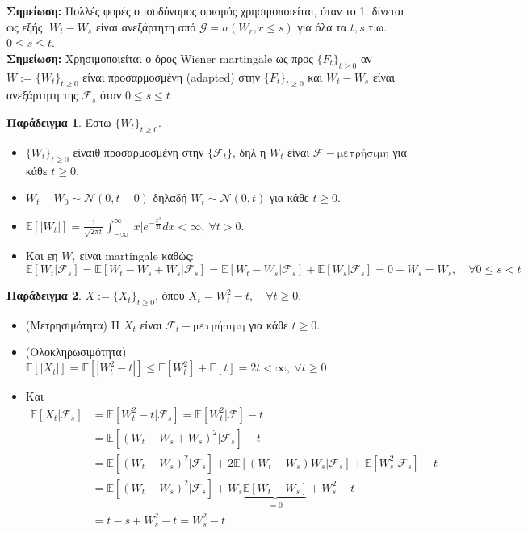 \documentclass[12pt,a4paper]{article}
\theoremstyle{definition}
\numberwithin{equation}{section}
\newtheorem{paradeigma}{Παράδειγμα}
\begin{document}
\textbf{\textbf{Σημείωση:}} Πολλές φορές ο ισοδύναμος ορισμός χρησιμοποιείται, όταν το 1. δίνεται ως εξής:
\(W_t - W_s\) είναι ανεξάρτητη από \(\mathcal{G} = \sigma(W_r, r\leq s)\) για όλα τα \(t,s\) τ.ω. \(0\leq s \leq t\).\\

\textbf{Σημείωση:} Χρησιμοποιείται ο όρος \textlatin{Wiener martingale} ως προς \(\{F_t\}_{t\geq 0}\) αν \(W:= \{W_t\}_{t\geq 0}\) είναι προσαρμοσμένη (\textlatin{adapted}) στην \(\{F_t\}_{t\geq 0}\) και \(W_t - W_s\) είναι
ανεξάρτητη της \(\mathcal{F}_s\) όταν \(0\leq s \leq t\)


\begin{paradeigma}
Έστω $\{W_t\}_{t\geq 0}$.

\begin{itemize}
\item $\{W_t\}_{t\geq 0}$ είναιθ προσαρμοσμένη στην $\{\mathcal{F}_t\}$, δηλ η $W_t$ είναι $\mathcal{F}-\text{μετρήσιμη}$ για κάθε $t\geq 0$.
\item $W_t - W_0 \sim \mathcal{N}(0,t-0)$ δηλαδή $W_t \sim \mathcal{N}(0,t)$ για κάθε $t\geq 0$.
\item $\mathbb{E}[|W_t|] = \frac{1}{\sqrt{2\pi t}} \int_{-\infty}^\infty |x|e^{-\frac{x^2}{2t}} dx < \infty, \: \forall t >0 $.
\item Και εη $W_t$ είναι \textlatin{martingale} καθώς:
$$\mathbb{E}[W_t|\mathcal{F}_s] = \mathbb{E}[W_t - W_s + W_s |\mathcal{F}_s] = \mathbb{E}[W_t - W_s | \mathcal{F}_s] + \mathbb{E}[W_s|\mathcal{F}_s] = 0 + W_s = W_s , \quad \forall 0 \leq s < t$$
\end{itemize}
\end{paradeigma}

\begin{paradeigma}
$X:= \{X_t\}_{t\geq 0}$, όπου $X_t = W_t^2 - t, \quad \forall t \geq 0$.
\begin{itemize}
\item (Μετρησιμότητα) Η $X_t$ είναι $\mathcal{F}_t -\text{μετρήσιμη}$ για κάθε $t \geq 0$.
\item (Ολοκληρωσιμότητα) $\mathbb{E}[|X_t|] = \mathbb{E}[|W_t^2 - t|] \leq \mathbb{E}[W_t^2] + \mathbb{E}[t] = 2t < \infty, \:\forall t\geq 0$
\item Και
\begin{align*} \mathbb{E}[X_t|\mathcal{F}_s] &= \mathbb{E}[W_t^2 - t | \mathcal{F}_s] = \mathbb{E}[W_t^2 | \mathcal{F}] - t \\
& = \mathbb{E}[(W_t - W_s + W_s)^2 | \mathcal{F}_s] - t \\
&= \mathbb{E}[(W_t-W_s)^2|\mathcal{F}_s] +  2\mathbb{E}[(W_t - W_s)W_s | \mathcal{F}_s] + \mathbb{E}[W_s^2 | \mathcal{F}_s] -t \\
&= \mathbb{E}[(W_t - W_s)^2 | \mathcal{F}_s] + W_s\underbrace{\mathbb{E}[W_t - W_s]}_{=0} + W_s^2 - t\\
&= t-s+W_s^2 - t = W_s^2 -t
\end{align*}
\end{itemize}
\end{paradeigma}
\end{document}
